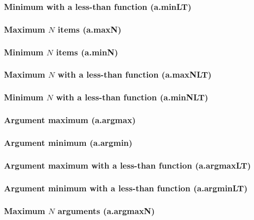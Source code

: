 \documentclass{article}
\theoremstyle{definition}
\begin{document}
\subsubsection{Minimum with a less-than function (a.minLT)}

\subsubsection{Maximum $N$ items (a.maxN)}

\subsubsection{Minimum $N$ items (a.minN)}

\subsubsection{Maximum $N$ with a less-than function (a.maxNLT)}

\subsubsection{Minimum $N$ with a less-than function (a.minNLT)}

\subsubsection{Argument maximum (a.argmax)}

\subsubsection{Argument minimum (a.argmin)}

\subsubsection{Argument maximum with a less-than function (a.argmaxLT)}

\subsubsection{Argument minimum with a less-than function (a.argminLT)}

\subsubsection{Maximum $N$ arguments (a.argmaxN)}
\end{document}

